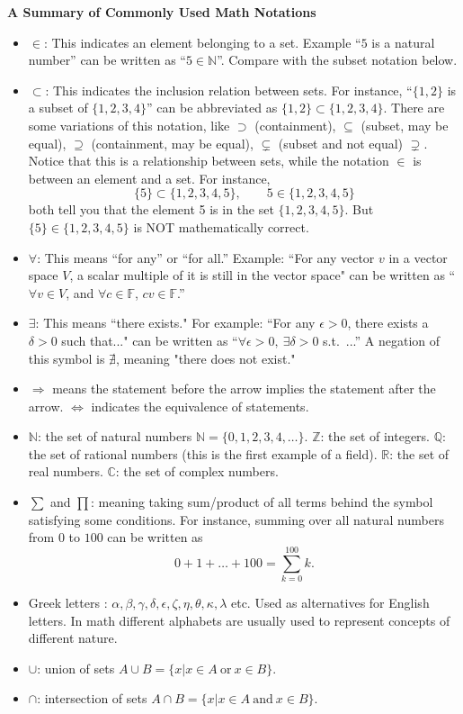 \documentclass[11pt]{article}
\theoremstyle{plain}
\theoremstyle{definition}
\def\R{\mathbb R}
\def\Q{\mathbb Q}
\def\Z{\mathbb Z}
\def\N{\mathbb N}
\def\C{\mathbb C}
\def\F{\mathbb F}
\begin{document}
\begin{center}
{\Large \bf A Summary of Commonly Used Math Notations}
\end{center}

\begin{itemize}
\item $\in$: This indicates an element belonging to a set. Example ``$5$ is a natural number'' can be written as ``$5\in \N$''. Compare with the subset notation below.
\item $\subset$: This indicates the inclusion relation between sets. For instance, ``$\{1,2\}$ is a subset of $\{1,2,3,4\}$'' can be abbreviated as $\{1,2\}\subset \{1,2,3,4\}$. There are some variations of this notation, like $\supset$ (containment), $\subseteq$ (subset, may be equal), $\supseteq$ (containment, may be equal), $\subsetneq$ (subset and not equal) $\supsetneq$. Notice that this is a relationship between sets, while the notation $\in$ is between an element and a set. For instance, 
\[
\{5\} \subset \{1,2,3,4,5\}, \quad \quad 5\in \{1,2,3,4,5\}
\]
both tell you that the element 5 is in the set $\{1,2,3,4,5\}$. But $\{5\}\in \{1,2,3,4,5\}$ is NOT mathematically correct.
\item $\forall$: This means ``for any'' or ``for all.'' Example: ``For any vector $v$ in a vector space $V$, a scalar multiple of it is still in the vector space" can be written as ``$\forall v\in V$, and $\forall c\in \F$, $cv\in \F$.''
\item $\exists$: This means ``there exists." For example: ``For any $\epsilon>0$, there exists a $\delta>0$ such that..." can be written as ``$\forall \epsilon>0,~\exists \delta>0$ s.t.~...'' A negation of this symbol is $\nexists$, meaning "there does not exist."
\item $\Rightarrow$ means the statement before the arrow implies the statement after the arrow. $\Leftrightarrow$ indicates the equivalence of statements.
\item $\N$: the set of natural numbers $\N=\{0,1,2,3,4,\dots\}$. $\Z$: the set of integers. $\Q$: the set of rational numbers (this is the first example of a field). $\R$: the set of real numbers. $\C$: the set of complex numbers.
\item $\sum$ and $\prod$: meaning taking sum/product of all terms behind the symbol satisfying some conditions. For instance, summing over all natural numbers from $0$ to $100$ can be written as
    \[
    0+1+\dots+100=\sum_{k=0}^{100} k.
    \]
\item Greek letters : $\alpha,\beta,\gamma,\delta,\epsilon,\zeta,\eta,\theta,\kappa,\lambda$ etc. Used as alternatives for English letters. In math different alphabets are usually used to represent concepts of different nature.
\item $\cup$: union of sets $A\cup B=\{x|x\in A~\textrm{or}~x\in B\}$. 
\item $\cap$: intersection of sets $A\cap B=\{x|x\in A~\textrm{and}~x\in B\}$.
\end{itemize}
\end{document}
